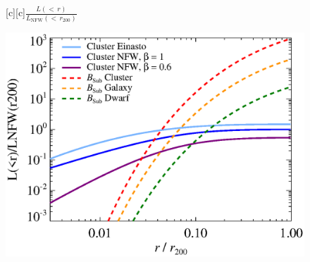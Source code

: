 \documentclass[dvips]{article}
\begin{document}
\pagestyle{empty}

\newcommand{\size}{\Large}%

\begin{figure}
  [c][c]{\size $\frac{\displaystyle L(<\,r)}{L_\mathrm{NFW}(\displaystyle<\,r_{200})}$}
  
    \includegraphics[width=\textwidth]{dens.prof_raw.eps}
\end{figure}
\end{document}
